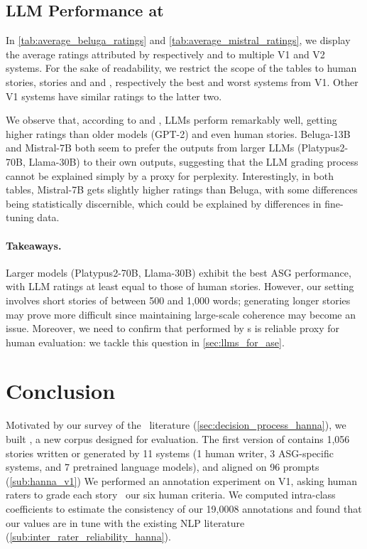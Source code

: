 \subsection{LLM Performance at {\asg}}
\label{sub:asg1_analysis}

In \autoref{tab:average_beluga_ratings} and \autoref{tab:average_mistral_ratings}, we display the average ratings attributed by respectively {\beluga} and {\mistral} to multiple V1 and V2 systems. For the sake of readability, we restrict the scope of the tables to human stories, {\llm} stories and {\gptt} and {\hint}, respectively the best and worst systems from {\hanna} V1. Other V1 systems have similar ratings to the latter two.

We observe that, according to {\beluga} and {\mistral}, LLMs perform remarkably well, getting higher ratings than older models (GPT-2) and even human stories. Beluga-13B and Mistral-7B both seem to prefer the outputs from larger LLMs (Platypus2-70B, Llama-30B) to their own outputs, suggesting that the LLM grading process cannot be explained simply by a proxy for perplexity. Interestingly, in both tables, Mistral-7B gets slightly higher ratings than Beluga, with some differences being statistically discernible, which could be explained by differences in fine-tuning data.

\paragraph{Takeaways.} Larger models (Platypus2-70B, Llama-30B) exhibit the best ASG performance, with LLM ratings at least equal to those of human stories. However, our setting involves short stories of between 500 and 1,000 words; generating longer stories may prove more difficult since maintaining large-scale coherence may become an issue. Moreover, we need to confirm that {\asefull} performed by {\llm}s is reliable proxy for human evaluation: we tackle this question in \autoref{sec:llms_for_ase}.

\section{Conclusion}

Motivated by our survey of the \asgfull\ literature (\autoref{sec:decision_process_hanna}), we built \hanna, a new corpus designed for {\asg} evaluation. The first version of {\hanna} contains 1,056 stories written or generated by 11 systems (1 human writer, 3 ASG-specific systems, and 7 pretrained language models), and aligned on 96 prompts (\autoref{sub:hanna_v1}) We performed an annotation experiment on {\hanna} V1, asking human raters to grade each story {\wrt}\ our six human criteria. We computed intra-class coefficients to estimate the consistency of our 19,0008 annotations and found that our values are in tune with the existing NLP literature (\autoref{sub:inter_rater_reliability_hanna}).

